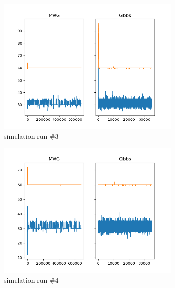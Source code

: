 \begin{figure}[H]
\begin{subfigure}{.3\textwidth}
    	\includegraphics[width=\linewidth]{../../plots/Trace_M3_N100_NMCMC3_seed2_diffind2.png}
    	\caption{simulation run \#3}
	\end{subfigure}
	\begin{subfigure}{.3\textwidth}
	    \centering
    	\includegraphics[width=\linewidth]{../../plots/Trace_M3_N100_NMCMC3_seed3_diffind2.png}
    	\caption{simulation run \#4}
	\end{subfigure}
	\begin{subfigure}{.3\textwidth}
	    \centering

\end{subfigure}
\end{figure}

